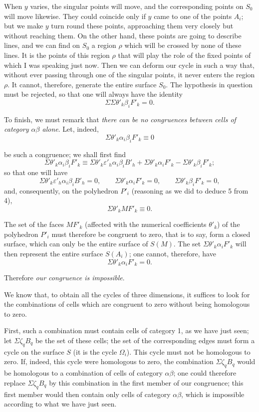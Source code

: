 \documentclass{article}
\begin{document}
When $y$ varies, the singular points will move, and the corresponding points on $S_{0}$ will move likewise. They could coincide only if $y$ came to one of the points $A_{i}$; but we make $y$ turn round these points, approaching them very closely but without reaching them. On the other hand, these points are going to describe lines, and we can find on $S_{0}$ a region $\rho$ which will be crossed by none of these lines. It is the points of this region $\rho$ that will play the role of the fixed points of which I was speaking just now. Then we can deform our cycle in such a way that, without ever passing through one of the singular points, it never enters the region $\rho$. It cannot, therefore, generate the entire surface $S_{0}$. The hypothesis in question must be rejected, so that one will always have the identity
\[ \Sigma \Sigma \theta'_{k} \beta_{i}F'_{k} = 0. \tag{9} \]

To finish, we must remark that \emph{there can be no congruences between cells of category $\alpha\beta$ alone}. Let, indeed,
\[ \Sigma \theta'_{k} \alpha_{i}\beta_{i}F'_{k} \equiv 0 \]

be such a congruence; we shall first find
\[ \Sigma \theta'_{k} \alpha_{i}\beta_{i}F'_{k} \equiv \Sigma \theta'_{k} \varepsilon'_{h} \alpha_{i}\beta_{i}B'_{h} + \Sigma \theta'_{k} \alpha_{i}F'_{k} - \Sigma \theta'_{k} \beta_{i}F'_{k}; \]
so that one will have
\[ \Sigma \theta'_{k} \varepsilon'_{h} \alpha_{i}\beta_{i}B'_{h} = 0, \qquad \Sigma \theta'_{k} \alpha_{i}F'_{k} = 0, \qquad \Sigma \theta'_{k} \beta_{i}F'_{k} = 0, \]
and, consequently, on the polyhedron $P'_{i}$ (reasoning as we did to deduce 5 from 4),
\[ \Sigma \theta'_{k} MF'_{k} \equiv 0. \]

The set of the faces $MF'_{k}$ (affected with the numerical coefficients $\theta'_{k}$) of the polyhedron $P'_{i}$ must therefore be congruent to zero, that is to say, form a closed surface, which can only be the entire surface of $S(M)$. The set $\Sigma \theta'_{k} \alpha_{i}F'_{k}$ will then represent the entire surface $S(A_{i})$; one cannot, therefore, have
\[ \Sigma \theta'_{k} \alpha_{i}F'_{k} = 0. \]

Therefore \emph{our congruence is impossible}.

We know that, to obtain all the cycles of three dimensions, it suffices to look for the combinations of cells which are congruent to zero without being homologous to zero.

First, such a combination must contain cells of category 1, as we have just seen; let $\Sigma \zeta_{q} B_{q}$ be the set of these cells; the set of the corresponding edges must form a cycle on the surface $S$ (it is the cycle $\Omega_{i}$). This cycle must not be homologous to zero. If, indeed, this cycle were homologous to zero, the combination $\Sigma \zeta_{q} B_{q}$ would be homologous to a combination of cells of category $\alpha\beta$; one could therefore replace $\Sigma \zeta_{q} B_{q}$ by this combination in the first member of our congruence; this first member would then contain only cells of category $\alpha\beta$, which is impossible according to what we have just seen.
\end{document}
